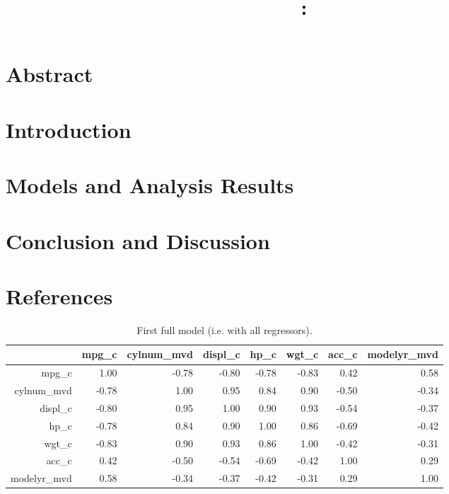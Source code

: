 \documentclass{article}
\title{
    \vspace{2in}
    \textmd{\textbf{\hmwkClass:\ \hmwkTitle}}\\
    \normalsize\vspace{0.1in}\small\vspace{0.1in}\large{\textit{\hmwkClassInstructor}}
    \vspace{3in}
}
\author{\hmwkAuthorName}
\date{}
\begin{document}
\maketitle

\newpage

\tableofcontents

\listoftables

\listoffigures

\section{Abstract}
\section{Introduction}
\section{Models and Analysis Results}
\section{Conclusion and Discussion}
\section{References}

\newpage

\begin{table}[ht]
\centering
\begin{tabular}{rrrrrrrr}
  \hline
 & mpg\_c & cylnum\_mvd & displ\_c & hp\_c & wgt\_c & acc\_c & modelyr\_mvd \\ 
  \hline
mpg\_c & 1.00 & -0.78 & -0.80 & -0.78 & -0.83 & 0.42 & 0.58 \\ 
  cylnum\_mvd & -0.78 & 1.00 & 0.95 & 0.84 & 0.90 & -0.50 & -0.34 \\ 
  displ\_c & -0.80 & 0.95 & 1.00 & 0.90 & 0.93 & -0.54 & -0.37 \\ 
  hp\_c & -0.78 & 0.84 & 0.90 & 1.00 & 0.86 & -0.69 & -0.42 \\ 
  wgt\_c & -0.83 & 0.90 & 0.93 & 0.86 & 1.00 & -0.42 & -0.31 \\ 
  acc\_c & 0.42 & -0.50 & -0.54 & -0.69 & -0.42 & 1.00 & 0.29 \\ 
  modelyr\_mvd & 0.58 & -0.34 & -0.37 & -0.42 & -0.31 & 0.29 & 1.00 \\ 
   \hline
\end{tabular}
\caption{First full model (i.e. with all regressors).}
\label{tab:myfirsttable}
\end{table}
\end{document}
